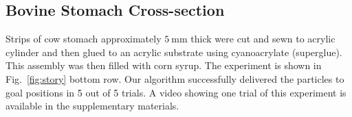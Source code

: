\subsection{Bovine Stomach Cross-section}

Strips of cow stomach approximately $\SI{5}{\milli\metre}$ thick were cut and sewn to acrylic cylinder and then glued to an acrylic substrate using cyanoacrylate (superglue). This assembly was then filled with corn syrup. The experiment is shown in Fig.~\ref{fig:story} bottom row. Our algorithm successfully delivered the particles to goal positions in 5 out of 5 trials.
A video showing one trial of this experiment is available in the supplementary materials. 



